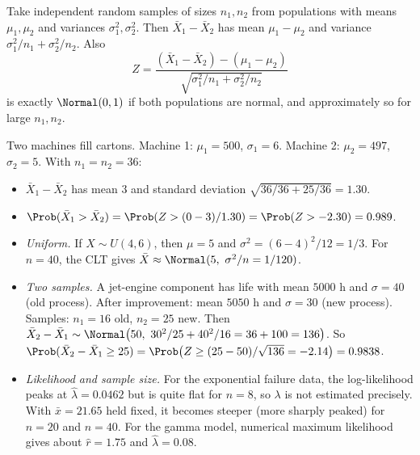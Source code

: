 \begin{theorem}\label{thm:diffmeans}
Take independent random samples of sizes $n_1,n_2$ from populations with means $\mu_1,\mu_2$ and variances $\sigma_1^2,\sigma_2^2$. Then $\bar{X}_1-\bar{X}_2$ has mean $\mu_1-\mu_2$ and variance $\sigma_1^2/n_1+\sigma_2^2/n_2$. Also
\[ Z=\frac{(\bar{X}_1-\bar{X}_2)-(\mu_1-\mu_2)}{\sqrt{\sigma_1^2/n_1+\sigma_2^2/n_2}} \]
is exactly $\Normal(0,1)$ if both populations are normal, and approximately so for large $n_1,n_2$.
\end{theorem}

\begin{example}
Two machines fill cartons. Machine 1: $\mu_1=500$, $\sigma_1=6$. Machine 2: $\mu_2=497$, $\sigma_2=5$. With $n_1=n_2=36$:
\begin{itemize}
  \item $\bar{X}_1-\bar{X}_2$ has mean $3$ and standard deviation $\sqrt{36/36+25/36}=1.30$.
  \item $\Prob(\bar{X}_1>\bar{X}_2)=\Prob(Z>(0-3)/1.30)=\Prob(Z>-2.30)=0.989$.
\end{itemize}
\end{example}

\begin{example}
\begin{itemize}
  \item \emph{Uniform.} If $X\sim U(4,6)$, then $\mu=5$ and $\sigma^2=(6-4)^2/12=1/3$. For $n=40$, the CLT gives $\bar{X}\approx\Normal(5,\ \sigma^2/n=1/120)$.
  \item \emph{Two samples.} A jet-engine component has life with mean $5000$ h and $\sigma=40$ (old process). After improvement: mean $5050$ h and $\sigma=30$ (new process). Samples: $n_1=16$ old, $n_2=25$ new. Then $\bar{X}_2-\bar{X}_1\sim\Normal\big(50,\ 30^2/25+40^2/16=36+100=136\big)$. So $\Prob(\bar{X}_2-\bar{X}_1\ge25)=\Prob\big(Z\ge(25-50)/\sqrt{136}=-2.14\big)=0.9838$.
  \item \emph{Likelihood and sample size.} For the exponential failure data, the log-likelihood peaks at $\hat\lambda=0.0462$ but is quite flat for $n=8$, so $\lambda$ is not estimated precisely. With $\bar{x}=21.65$ held fixed, it becomes steeper (more sharply peaked) for $n=20$ and $n=40$. For the gamma model, numerical maximum likelihood gives about $\hat{r}=1.75$ and $\hat\lambda=0.08$.
\end{itemize}
\end{example}

